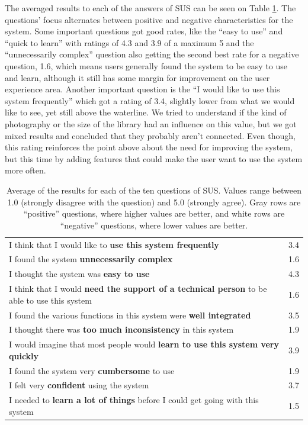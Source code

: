 The averaged results to each of the answers of \ac{SUS} can be seen on Table \ref{tab:sus}. The questions' focus alternates between positive and negative characteristics for the system. Some important questions got good rates, like the ``easy to use'' and ``quick to learn'' with ratings of 4.3 and 3.9 of a maximum 5 and the ``unnecessarily complex'' question also getting the second best rate for a negative question, 1.6, which means users generally found the system to be easy to use and learn, although it still has some margin for improvement on the user experience area. Another important question is the ``I would like to use this system frequently'' which got a rating of 3.4, slightly lower from what we would like to see, yet still above the waterline. We tried to understand if the kind of photography or the size of the library had an influence on this value, but we got mixed results and concluded that they probably aren't connected. Even though, this rating reinforces the point above about the need for improving the system, but this time by adding features that could make the user want to use the system more often.

\vspace{\baselineskip}

\begin{table}[h!]
	\renewcommand{\arraystretch}{1.5}
	\centering
\begin{tabular}{l|c}
I think that I would like to \textbf{use this system frequently} & 3.4\\
I found the system \textbf{unnecessarily complex} & 1.6\\
I thought the system was \textbf{easy to use} & 4.3\\
I think that I would \textbf{need the support of a technical person} to be able to use this system & 1.6\\
I found the various functions in this system were \textbf{well integrated} & 3.5\\
I thought there was \textbf{too much inconsistency} in this system & 1.9\\
I would imagine that most people would \textbf{learn to use this system very quickly} & 3.9\\
I found the system very \textbf{cumbersome} to use & 1.9\\
I felt very \textbf{confident} using the system & 3.7\\
I needed to \textbf{learn a lot of things} before I could get going with this system & 1.5\\
\end{tabular}
\caption[Average of the results for each of the ten questions of \ac{SUS}.]{Average of the results for each of the ten questions of \ac{SUS}. Values range between 1.0 (strongly disagree with the question) and 5.0 (strongly agree). Gray rows are ``positive'' questions, where higher values are better, and white rows are ``negative'' questions, where lower values are better.}
\label{tab:sus}
\vspace{\baselineskip}
\end{table}





